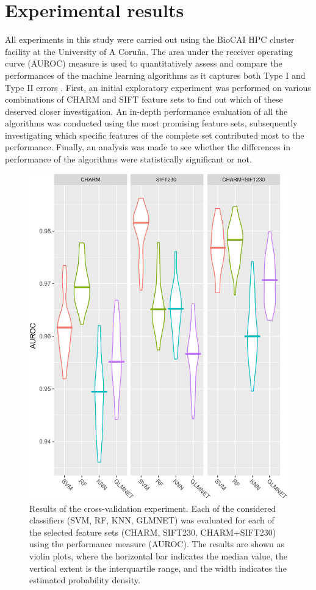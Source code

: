 \section{Experimental results}
\label{ch5:sec:experimental-results}
All experiments in this study were carried out using the BioCAI HPC cluster facility at the University of A Coru\~{n}a. The area under the receiver operating curve (AUROC) measure is used to quantitatively assess and compare the performances of the machine learning algorithms as it captures both Type I and Type II errors \cite{fawcett2006introduction}. First, an initial exploratory experiment was performed on various combinations of CHARM and SIFT feature sets to find out which of these deserved closer investigation. An in-depth performance evaluation of all the algorithms was conducted using the most promising feature sets, subsequently investigating which specific features of the complete set contributed most to the performance. Finally, an analysis was made to see whether the differences in performance of the algorithms were statistically significant or not.
\begin{figure}[h!]
	\centering
	\includegraphics[width=0.9\columnwidth]{fig05}
	\caption{Results of the cross-validation experiment. Each of the considered classifiers (SVM, RF, KNN, GLMNET) was evaluated for each of the selected feature sets (CHARM, SIFT230, CHARM+SIFT230) using the performance measure (AUROC). The results are shown as violin plots, where the horizontal bar indicates the median value, the vertical extent is the interquartile range, and the width indicates the estimated probability density.}
	\label{ch5_fig5}
\end{figure}
